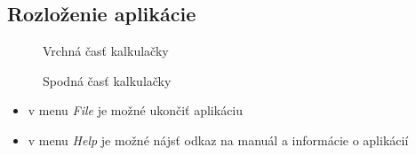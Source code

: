 \documentclass[a4paper, 11pt]{article}
\begin{document}
    \subsection{Rozloženie aplikácie}
    \begin{figure}[!h]
        \centering
        \caption{Vrchná časť kalkulačky}
        \label{fig:obrazok1}
    \end{figure}
    
    \begin{figure}[!h]
        \centering
        \caption{Spodná časť kalkulačky}
        \label{fig:obrazok2}
    \end{figure}
    
    \begin{itemize}
        \item v menu \emph{File} je možné ukončiť aplikáciu
        \item v menu \emph{Help} je možné nájsť odkaz na manuál a informácie o aplikácií
    \end{itemize}
    \newpage
\end{document}
